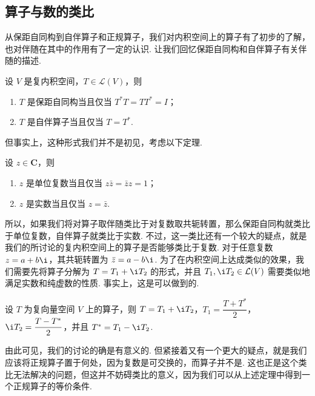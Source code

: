 \subsection{算子与数的类比}

从保距自同构到自伴算子和正规算子，我们对内积空间上的算子有了初步的了解，也对伴随在其中的作用有了一定的认识. 让我们回忆保距自同构和自伴算子有关伴随的描述.

\begin{theorem}{}{}
    设 $ V $ 是复内积空间，$ T \in \mathcal{L}(V) $，则
    \begin{enumerate}
        \item $ T $ 是保距自同构当且仅当 $ T^*T = TT^* = I $；

        \item $ T $ 是自伴算子当且仅当 $ T = T^* $.
    \end{enumerate}
\end{theorem}

但事实上，这种形式我们并不是初见，考虑以下定理.

\begin{theorem}{}{}
    设 $ z \in \mathbf{C} $，则
    \begin{enumerate}
        \item $ z $ 是单位复数当且仅当 $ z\bar{z} = \bar{z}z = 1 $；

        \item $ z $ 是实数当且仅当 $ z = \bar{z} $.
    \end{enumerate}
\end{theorem}

所以，如果我们将对算子取伴随类比于对复数取共轭转置，那么保距自同构就类比于单位复数，自伴算子就类比于实数. 不过，这一类比还有一个较大的疑点，就是我们的所讨论的复内积空间上的算子是否能够类比于复数. 对于任意复数 $ z = a + b\i $，其共轭转置为 $ \bar{z} = a - b\i $. 为了在内积空间上达成类似的效果，我们需要先将算子分解为 $ T = T_1 + \i T_2 $ 的形式，并且 $ T_1, \i T_2 \in \mathcal{L}(V) $ 需要类似地满足实数和纯虚数的性质. 事实上，这是可以做到的.

\begin{theorem}{}{}
    设 $ T $ 为复向量空间 $ V $ 上的算子，则 $ T = T_1 + \i T_2 $，$ T_1 = \dfrac{T + T^*}{2} $，$ \i T_2 = \dfrac{T - T^*}{2} $，并且 $ T^* = T_1 - \i T_2 $.
\end{theorem}

由此可见，我们的讨论的确是有意义的. 但紧接着又有一个更大的疑点，就是我们应该将正规算子置于何处，因为复数是可交换的，而算子并不是. 这也正是这个类比无法解决的问题，但这并不妨碍类比的意义，因为我们可以从上述定理中得到一个正规算子的等价条件.

